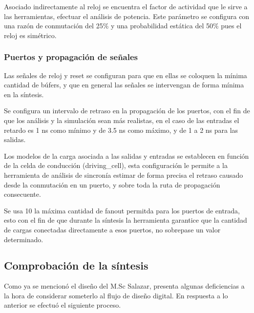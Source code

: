 Asociado indirectamente al reloj se encuentra el factor de actividad que le sirve a las herramientas, efectuar el análisis de potencia. Este parámetro se configura con una razón de conmutación del 25\% y una probabilidad estática del 50\% pues el reloj es simétrico.

\subsubsection{Puertos y propagación de señales}

Las señales de reloj y reset se configuran para que en ellas se coloquen la mínima cantidad de búfers, y que en general las señales se intervengan de forma mínima en la síntesis.

Se configura un intervalo de retraso en la propagación de los puertos, con el fin de que los análisis y la simulación sean más realistas, en el caso de las entradas el retardo es 1 ns como mínimo y de 3.5 ns como máximo, y de 1 a 2 ns para las salidas.

Los modelos de la carga asociada a las salidas y entradas se establecen en función de la celda de conducción (driving\_cell), esta configuración le permite a la herramienta de análisis de sincronía estimar de forma precisa el retraso causado desde la conmutación en un puerto, y sobre toda la ruta de propagación consecuente.

Se usa 10 la máxima cantidad de fanout permitda para los puertos de entrada, esto con el fin de que durante la síntesis la herramienta garantice que la cantidad de cargas conectadas directamente a esos puertos, no sobrepase un valor determinado.

\subsection{Comprobación de la síntesis}

Como ya se mencionó el diseño del M.Sc Salazar, presenta algunas deficiencias a la hora de considerar someterlo al flujo de diseño digital. En respuesta a lo anterior se efectuó el siguiente proceso.

